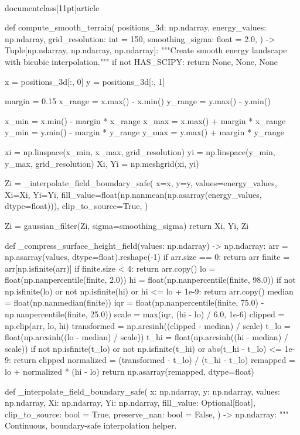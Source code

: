 \\documentclass[11pt]{article}
\begin{document}
\begin{CodeBlock}
def compute_smooth_terrain(
    positions_3d: np.ndarray,
    energy_values: np.ndarray,
    grid_resolution: int = 150,
    smoothing_sigma: float = 2.0,
) -> Tuple[np.ndarray, np.ndarray, np.ndarray]:
    """Create smooth energy landscape with bicubic interpolation."""
    if not HAS_SCIPY:
        return None, None, None

    x = positions_3d[:, 0]
    y = positions_3d[:, 1]

    margin = 0.15
    x_range = x.max() - x.min()
    y_range = y.max() - y.min()

    x_min = x.min() - margin * x_range
    x_max = x.max() + margin * x_range
    y_min = y.min() - margin * y_range
    y_max = y.max() + margin * y_range

    xi = np.linspace(x_min, x_max, grid_resolution)
    yi = np.linspace(y_min, y_max, grid_resolution)
    Xi, Yi = np.meshgrid(xi, yi)

    Zi = _interpolate_field_boundary_safe(
        x=x,
        y=y,
        values=energy_values,
        Xi=Xi,
        Yi=Yi,
        fill_value=float(np.nanmean(np.asarray(energy_values, dtype=float))),
        clip_to_source=True,
    )

    Zi = gaussian_filter(Zi, sigma=smoothing_sigma)
    return Xi, Yi, Zi


def _compress_surface_height_field(values: np.ndarray) -> np.ndarray:
    arr = np.asarray(values, dtype=float).reshape(-1)
    if arr.size == 0:
        return arr
    finite = arr[np.isfinite(arr)]
    if finite.size < 4:
        return arr.copy()
    lo = float(np.nanpercentile(finite, 2.0))
    hi = float(np.nanpercentile(finite, 98.0))
    if not np.isfinite(lo) or not np.isfinite(hi) or hi <= lo + 1e-9:
        return arr.copy()
    median = float(np.nanmedian(finite))
    iqr = float(np.nanpercentile(finite, 75.0) - np.nanpercentile(finite, 25.0))
    scale = max(iqr, (hi - lo) / 6.0, 1e-6)
    clipped = np.clip(arr, lo, hi)
    transformed = np.arcsinh((clipped - median) / scale)
    t_lo = float(np.arcsinh((lo - median) / scale))
    t_hi = float(np.arcsinh((hi - median) / scale))
    if not np.isfinite(t_lo) or not np.isfinite(t_hi) or abs(t_hi - t_lo) <= 1e-9:
        return clipped
    normalized = (transformed - t_lo) / (t_hi - t_lo)
    remapped = lo + normalized * (hi - lo)
    return np.asarray(remapped, dtype=float)


def _interpolate_field_boundary_safe(
    x: np.ndarray,
    y: np.ndarray,
    values: np.ndarray,
    Xi: np.ndarray,
    Yi: np.ndarray,
    fill_value: Optional[float],
    clip_to_source: bool = True,
    preserve_nan: bool = False,
) -> np.ndarray:
    """
    Continuous, boundary-safe interpolation helper.


\end{CodeBlock}
\end{document}
